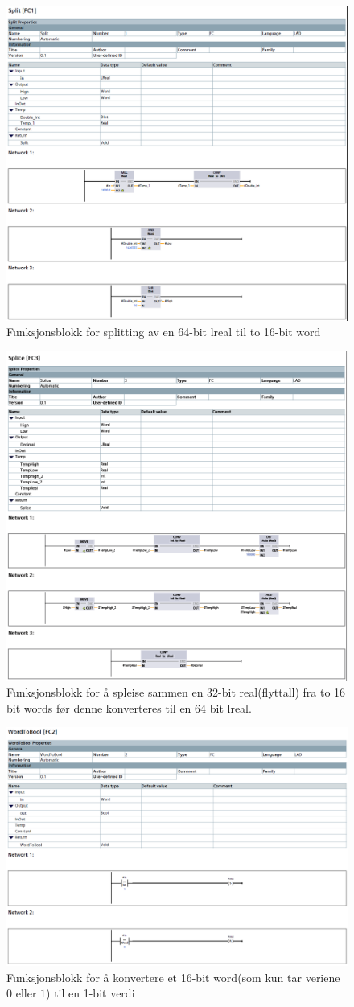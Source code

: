 \begin{figure}[H]
    \centering
    \includegraphics[width=0.5\linewidth]{FBDs/split.PNG}
    \caption{Funksjonsblokk for splitting av en 64-bit \Gls{lreal} til to 16-bit \gls{word}}
    \label{fig:split}
\end{figure}
\begin{figure}[H]
    \centering
    \includegraphics[width=0.5\linewidth]{FBDs/Splice.PNG}
    \caption{Funksjonsblokk for å spleise sammen en 32-bit \Gls{real}(flyttall) fra to 16 bit \glspl{word} før denne konverteres til en 64 bit \Gls{lreal}.}
    \label{fig:Splice}
\end{figure}

\begin{figure}[H]
    \centering
    \includegraphics[width=0.5\linewidth]{FBDs/WordToBool.PNG}
    \caption{Funksjonsblokk for å konvertere et 16-bit \gls{word}(som kun tar veriene $0$  eller  $1$) til en 1-bit  verdi}
    \label{fig:WTB}
\end{figure}